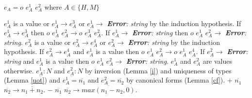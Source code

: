 \begin{case}

$e_{A}=o$ $e_{A}^{1}$ $e_{A}^{2}$ where $A\in\lbrace H,M\rbrace$

$e_{A}^{1}$ is a value or $e_{A}^{1}\rightarrow e_{A}^{3}$ or $e_{A}^{1}\rightarrow$ \emph{\textbf{Error}: string} by the induction hypothesis.  If $e_{A}^{1}\rightarrow e_{A}^{3}$ then $o$ $e_{A}^{1}$ $e_{A}^{2}\rightarrow o$ $e_{A}^{3}$ $e_{A}^{2}$.  If $e_{A}^{1}\rightarrow$ \emph{\textbf{Error}: string} then $o$ $e_{A}^{1}$ $e_{A}^{2}\rightarrow$ \emph{\textbf{Error}: string}.  $e_{A}^{2}$ is a value or $e_{A}^{2}\rightarrow e_{A}^{4}$ or $e_{A}^{2}\rightarrow$ \emph{\textbf{Error}: string} by the induction hypothesis.  If $e_{A}^{2}\rightarrow e_{A}^{4}$ and $e_{A}^{1}$ is a value then $o$ $e_{A}^{1}$ $e_{A}^{2}\rightarrow o$ $e_{A}^{1}$ $e_{A}^{4}$.  If $e_{A}^{2}\rightarrow$ \emph{\textbf{Error}: string} and $e_{A}^{1}$ is a value then $o$ $e_{A}^{1}$ $e_{A}^{2}\rightarrow$ \emph{\textbf{Error}: string}.  $e_{A}^{1}$ and $e_{A}^{2}$ are values otherwise.  $e_{A}^{1}:N$ and $e_{A}^{2}:N$ by inversion (Lemma \ref{i}) and uniqueness of types (Lemma \ref{uot}) and $e_{A}^{1}=\overline{n_{1}}$ and $e_{A}^{2}=\overline{n_{2}}$ by canonical forms (Lemma \ref{cf}).  $+$ $\overline{n_{1}}$ $\overline{n_{2}}\rightarrow\overline{n_{1}+n_{2}}$.  $-$ $\overline{n_{1}}$ $\overline{n_{2}}\rightarrow\overline{max(n_{1}-n_{2},0)}$.

\end{case}